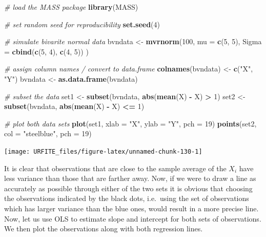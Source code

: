 \documentclass[]{book}
\newenvironment{Shaded}{\begin{snugshade}}{\end{snugshade}}
\newcommand{\KeywordTok}[1]{\textcolor[rgb]{0.13,0.29,0.53}{\textbf{#1}}}
\newcommand{\DataTypeTok}[1]{\textcolor[rgb]{0.13,0.29,0.53}{#1}}
\newcommand{\DecValTok}[1]{\textcolor[rgb]{0.00,0.00,0.81}{#1}}
\newcommand{\StringTok}[1]{\textcolor[rgb]{0.31,0.60,0.02}{#1}}
\newcommand{\CommentTok}[1]{\textcolor[rgb]{0.56,0.35,0.01}{\textit{#1}}}
\newcommand{\OperatorTok}[1]{\textcolor[rgb]{0.81,0.36,0.00}{\textbf{#1}}}
\newcommand{\NormalTok}[1]{#1}
\theoremstyle{definition}
\theoremstyle{definition}
\theoremstyle{definition}
\theoremstyle{remark}
\begin{document}
\begin{Shaded}
\begin{Highlighting}[]
\CommentTok{# load the MASS package}
\KeywordTok{library}\NormalTok{(MASS)}

\CommentTok{# set random seed for reproducibility}
\KeywordTok{set.seed}\NormalTok{(}\DecValTok{4}\NormalTok{)}

\CommentTok{# simulate bivarite normal data}
\NormalTok{bvndata <-}\StringTok{ }\KeywordTok{mvrnorm}\NormalTok{(}\DecValTok{100}\NormalTok{, }
                \DataTypeTok{mu =} \KeywordTok{c}\NormalTok{(}\DecValTok{5}\NormalTok{, }\DecValTok{5}\NormalTok{), }
                \DataTypeTok{Sigma =} \KeywordTok{cbind}\NormalTok{(}\KeywordTok{c}\NormalTok{(}\DecValTok{5}\NormalTok{, }\DecValTok{4}\NormalTok{), }\KeywordTok{c}\NormalTok{(}\DecValTok{4}\NormalTok{, }\DecValTok{5}\NormalTok{))}
\NormalTok{                ) }

\CommentTok{# assign column names / convert to data.frame}
\KeywordTok{colnames}\NormalTok{(bvndata) <-}\StringTok{ }\KeywordTok{c}\NormalTok{(}\StringTok{"X"}\NormalTok{, }\StringTok{"Y"}\NormalTok{)}
\NormalTok{bvndata <-}\StringTok{ }\KeywordTok{as.data.frame}\NormalTok{(bvndata)}

\CommentTok{# subset the data}
\NormalTok{set1 <-}\StringTok{ }\KeywordTok{subset}\NormalTok{(bvndata, }\KeywordTok{abs}\NormalTok{(}\KeywordTok{mean}\NormalTok{(X) }\OperatorTok{-}\StringTok{ }\NormalTok{X) }\OperatorTok{>}\StringTok{ }\DecValTok{1}\NormalTok{)}
\NormalTok{set2 <-}\StringTok{ }\KeywordTok{subset}\NormalTok{(bvndata, }\KeywordTok{abs}\NormalTok{(}\KeywordTok{mean}\NormalTok{(X) }\OperatorTok{-}\StringTok{ }\NormalTok{X) }\OperatorTok{<=}\StringTok{ }\DecValTok{1}\NormalTok{)}

\CommentTok{# plot both data sets}
\KeywordTok{plot}\NormalTok{(set1, }\DataTypeTok{xlab =} \StringTok{"X"}\NormalTok{, }\DataTypeTok{ylab =} \StringTok{"Y"}\NormalTok{, }\DataTypeTok{pch =} \DecValTok{19}\NormalTok{)}
\KeywordTok{points}\NormalTok{(set2, }\DataTypeTok{col =} \StringTok{"steelblue"}\NormalTok{, }\DataTypeTok{pch =} \DecValTok{19}\NormalTok{)}
\end{Highlighting}
\end{Shaded}

\begin{center}\texttt{[image: URFITE\_files/figure-latex/unnamed-chunk-130-1]} \end{center}

It is clear that observations that are close to the sample average of
the \(X_i\) have less variance than those that are farther away. Now, if
we were to draw a line as accurately as possible through either of the
two sets it is obvious that choosing the observations indicated by the
black dots, i.e.~using the set of observations which has larger variance
than the blue ones, would result in a more precise line. Now, let us use
OLS to estimate slope and intercept for both sets of observations. We
then plot the observations along with both regression lines.
\end{document}
